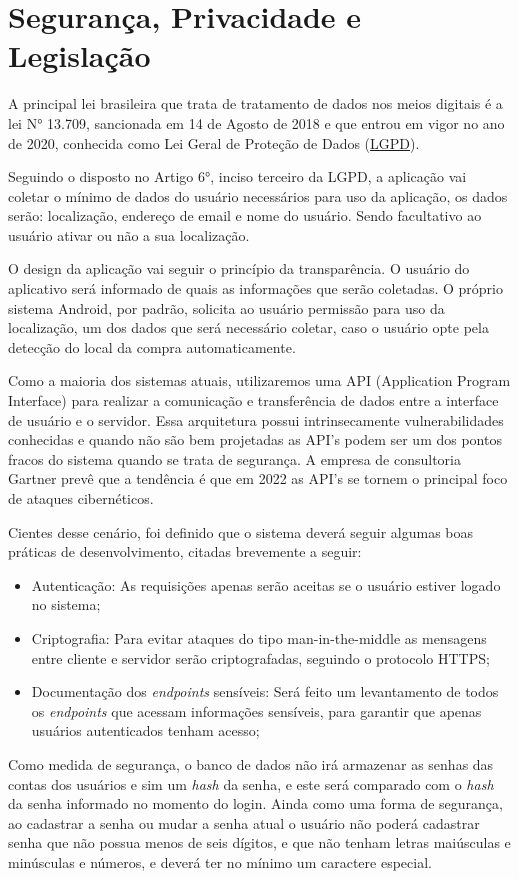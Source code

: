 \section{Segurança, Privacidade e Legislação}

A principal lei brasileira que trata de tratamento de dados  nos meios digitais é a lei N° 13.709, sancionada em 14 de Agosto de 2018 \cite{leigpd} e que entrou em vigor no ano de 2020, conhecida como Lei Geral de Proteção de Dados (\label{sig:lgpd}\hyperlink{s:lgpd}{LGPD}).

Seguindo o disposto no Artigo 6°, inciso terceiro da LGPD, a aplicação vai coletar o mínimo de dados do usuário necessários para uso da aplicação, os dados serão: localização, endereço de email e nome do usuário. Sendo facultativo ao usuário ativar ou não a sua localização.

O design da aplicação vai seguir o princípio da transparência. O usuário do aplicativo será informado de quais as informações que serão coletadas. O próprio sistema Android, por padrão, solicita ao usuário permissão para uso da localização, um dos dados que será necessário coletar, caso o usuário opte pela detecção do local da compra automaticamente.

Como a maioria dos sistemas atuais, utilizaremos uma API (Application Program Interface) para realizar a comunicação e transferência de dados entre a interface de usuário e o servidor. Essa arquitetura possui intrinsecamente vulnerabilidades conhecidas e quando não são bem projetadas as API’s podem ser um dos pontos fracos do sistema quando se trata de segurança. A empresa de consultoria Gartner \cite{anilLamba} prevê que a tendência é que em 2022 as API’s se tornem o principal foco de ataques cibernéticos.

Cientes desse cenário, foi definido que o sistema deverá seguir algumas boas práticas de desenvolvimento, citadas brevemente a seguir:
\begin{itemize}
	\item Autenticação: As requisições apenas serão aceitas se o usuário estiver logado no sistema;
	\item Criptografia: Para evitar ataques do tipo man-in-the-middle as mensagens entre cliente e servidor serão criptografadas, seguindo o protocolo HTTPS;
	\item Documentação dos \textit{endpoints} sensíveis: Será feito um levantamento de todos os \textit{endpoints} que acessam informações sensíveis, para garantir que apenas usuários autenticados tenham acesso;
\end{itemize}

Como medida de segurança, o banco de dados não irá armazenar as senhas das contas dos usuários e sim um \textit{hash} da senha, e este será comparado com o \textit{hash} da senha informado no momento do login. Ainda como uma forma de segurança, ao cadastrar a senha ou mudar a senha atual o usuário não poderá cadastrar senha que não possua menos de seis dígitos, e que não tenham letras maiúsculas e minúsculas e números, e deverá ter no mínimo um caractere especial.